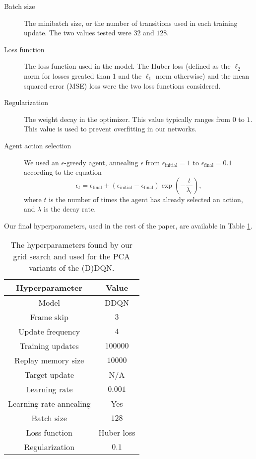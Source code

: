 \documentclass[11pt]{article}
\begin{document}
\begin{description}
    \item[Batch size] The minibatch size, or the number of transitions used in each training update. The two values tested were $32$ and $128$.
    
    \item[Loss function] The loss function used in the model. The Huber loss (defined as the $\ell_2$ norm for losses greated than 1 and the $\ell_1$ norm otherwise) and the mean squared error (MSE) loss were the two loss functions considered.
    
    \item[Regularization] The weight decay in the optimizer. This value typically ranges from $0$ to $1$. This value is used to prevent overfitting in our networks.
    
    \item[Agent action selection] We used an $\epsilon$-greedy agent, annealing $\epsilon$ from $\epsilon_\text{initial} = 1$ to $\epsilon_\text{final} = 0.1$ according to the equation $$\epsilon_t = \epsilon_\text{final} + (\epsilon_\text{initial} - \epsilon_\text{final}) \exp\left(-\frac{t}{\lambda_\epsilon}\right),$$ where $t$ is the number of times the agent has already selected an action, and $\lambda$ is the decay rate. 
\end{description}

Our final hyperparameters, used in the rest of the paper, are available in Table \ref{tab:grid_search_hyperparameters}.

\begin{table}[!htbp]
    \centering
    \begin{tabular}{c|c}
        \toprule
        Hyperparameter & Value \\ \midrule
        Model & DDQN \\
        Frame skip & $3$ \\
        Update frequency & $4$ \\
        Training updates & $100000$ \\
        Replay memory size & $10000$ \\
        Target update & N/A \\
        Learning rate & $0.001$ \\
        Learning rate annealing & Yes \\
        Batch size & $128$ \\
        Loss function & Huber loss \\
        Regularization & $0.1$ \\
        \bottomrule
    \end{tabular}
    \caption{The hyperparameters found by our grid search and used for the PCA variants of the (D)DQN.}
    \label{tab:grid_search_hyperparameters}
\end{table}
\end{document}
